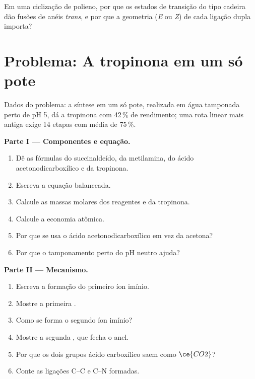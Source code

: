 \begin{exercise}[$\star\star\star$]\label{exo:b3:total-synthesis:12}
Em uma ciclização de polieno, por que os estados de transição do tipo cadeira dão fusões de anéis
\textit{trans}, e por que a geometria (\textit{E} ou \textit{Z}) de cada ligação dupla importa?
\end{exercise}

\section{Problema: A tropinona em um só pote}

\begin{problem}
\label{pb:b3:total-synthesis:1}
Dados do problema: a síntese em um só pote, realizada em água tamponada perto de pH 5,
dá a tropinona com 42\,\% de rendimento; uma rota linear mais antiga exige 14 etapas com média de 75\,\%.

\medskip\noindent\textbf{Parte I --- Componentes e equação.}
\begin{enumerate}
  \item Dê as fórmulas do succinaldeído, da metilamina, do ácido acetonodicarboxílico
        e da tropinona.
  \item Escreva a equação balanceada.
  \item Calcule as massas molares dos reagentes e da tropinona.
  \item Calcule a economia atômica.
  \item Por que se usa o ácido acetonodicarboxílico em vez da acetona?
  \item Por que o tamponamento perto do pH neutro ajuda?
\end{enumerate}

\medskip\noindent\textbf{Parte II --- Mecanismo.}
\begin{enumerate}[resume]
  \item Escreva a formação do primeiro íon imínio.
  \item Mostre a primeira .
  \item Como se forma o segundo íon imínio?
  \item Mostre a segunda , que fecha o anel.
  \item Por que os dois grupos ácido carboxílico saem como $\ce{CO2}$?
  \item Conte as ligações C--C e C--N formadas.
\end{enumerate}


\end{problem}
